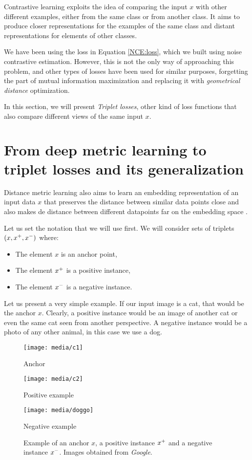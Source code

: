 \label{Chapter:connection:triplets}

Contrastive learning exploits the idea of comparing the input $x$ with other different examples, either from the same class or from another class. It aims to produce closer representations for the examples of the same class and distant representations for elements of other classes.

We have been using the loss in Equation \eqref{NCE:loss}, which we built using noise contrastive estimation. However, this is not the only way of approaching this problem, and other types of losses have been used for similar purposes, forgetting the part of mutual information maximization and replacing it with \emph{geometrical distance} optimization.

In this section, we will present \emph{Triplet losses}, other kind of loss functions that also compare different views of the same input $x$.

\section{From deep metric learning to triplet losses and its generalization}

Distance metric learning also aims to learn an embedding representation of an input data $x$ that preserves the distance between similar data points close and also makes de distance between different datapoints far on the embedding space \citep{Sohn2016ImprovedDM}.

Let us set the notation that we will use first. We will consider sets of triplets $(x,x^+,x^-)$ where:
\begin{itemize}
\item The element $x$ is an anchor point,
\item The element $x^+$ is a positive instance,
\item The element $x^-$ is a negative instance.
\end{itemize}

\begin{nexample}
    Let us present a very simple example. If our input image is a cat, that would be the anchor $x$. Clearly, a positive instance would be an image of another cat or even the same cat seen from another perspective. A negative instance would be a photo of any other animal, in this case we use a dog.
    \begin{figure}[H]%
          \texttt{[image: media/c1]}
          \caption*{Anchor}\label{fig:cat1}
        \endminipage\hfill
          \texttt{[image: media/c2]}
          \caption*{Positive example}\label{fig:c2}
        \endminipage
          \texttt{[image: media/doggo]}
          \caption*{Negative example}\label{fig:doggo}
        \endminipage
        \caption{Example of an anchor $x$, a positive instance $x^+$ and a negative instance $x^-$. Images obtained from \emph{Google}.}
        \end{figure}
    \end{nexample}
    


